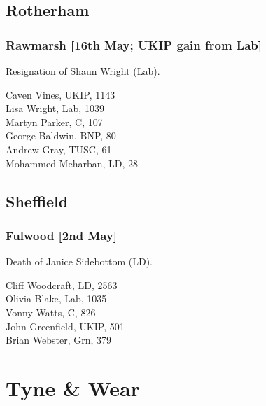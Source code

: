 \documentclass[a4paper,openany,10pt]{book}
\begin{document}
\subsection*{Rotherham}

\subsubsection*{Rawmarsh \hspace*{\fill}\nolinebreak[1]%
\enspace\hspace*{\fill}
[16th May; UKIP gain from Lab]}


Resignation of Shaun Wright (Lab).



Caven Vines, UKIP, 1143\\
Lisa Wright, Lab, 1039\\
Martyn Parker, C, 107\\
George Baldwin, BNP, 80\\
Andrew Gray, TUSC, 61\\
Mohammed Meharban, LD, 28\\


\subsection*{Sheffield}

\subsubsection*{Fulwood \hspace*{\fill}\nolinebreak[1]%
\enspace\hspace*{\fill}
[2nd May]}


Death of Janice Sidebottom (LD).



Cliff Woodcraft, LD, 2563\\
Olivia Blake, Lab, 1035\\
Vonny Watts, C, 826\\
John Greenfield, UKIP, 501\\
Brian Webster, Grn, 379\\


\vfill

\section[Tyne and Wear]{Tyne \& Wear}
\end{document}
